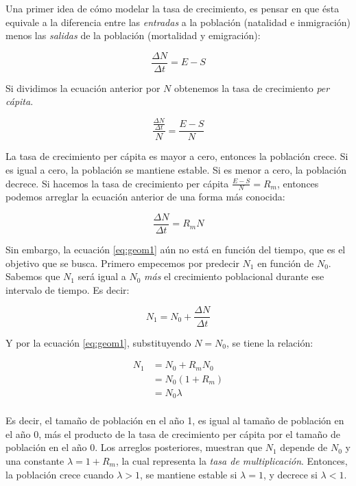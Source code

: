 \documentclass[12pt,letterpaper,]{book}
\begin{document}
Una primer idea de cómo modelar la tasa de crecimiento, es pensar en que
ésta equivale a la diferencia entre las \emph{entradas} a la población
(natalidad e inmigración) menos las \emph{salidas} de la población
(mortalidad y emigración):

\[
\frac{\Delta N}{\Delta t} = E-S
\]

Si dividimos la ecuación anterior por \(N\) obtenemos la tasa de
crecimiento \emph{per cápita}.

\[
\frac{\frac{\Delta N}{\Delta t}}{N} = \frac{E-S}{N}
\]

La tasa de crecimiento per cápita es mayor a cero, entonces la población
crece. Si es igual a cero, la población se mantiene estable. Si es menor
a cero, la población decrece. Si hacemos la tasa de crecimiento per
cápita \(\frac{E-S}{N}=R_m\), entonces podemos arreglar la ecuación
anterior de una forma más conocida:

\begin{equation}
\frac{\Delta N}{\Delta t}=R_m N
 \label{eq:geom1}
\end{equation}

Sin embargo, la ecuación \eqref{eq:geom1} aún no está en función del
tiempo, que es el objetivo que se busca. Primero empecemos por predecir
\(N_1\) en función de \(N_0\). Sabemos que \(N_1\) será igual a \(N_0\)
\emph{más} el crecimiento poblacional durante ese intervalo de tiempo.
Es decir:

\[
N_1 = N_0 + \frac{\Delta N}{\Delta t}
\]

Y por la ecuación \eqref{eq:geom1}, substituyendo \(N = N_0\), se tiene la
relación:

\begin{equation}
\begin{split}
N_1 &= N_0 + R_m N_0\\
    &= N_0 \left( 1 + R_m \right)\\
    &= N_0 \lambda\\
\end{split}
\end{equation}

Es decir, el tamaño de población en el año 1, es igual al tamaño de
población en el año 0, más el producto de la tasa de crecimiento per
cápita por el tamaño de población en el año 0. Los arreglos posteriores,
muestran que \(N_1\) depende de \(N_0\) y una constante
\(\lambda = 1+R_m\), la cual representa la \emph{tasa de
multiplicación}. Entonces, la población
crece cuando \(\lambda > 1\), se mantiene estable si \(\lambda = 1\), y
decrece si \(\lambda < 1\).
\end{document}
